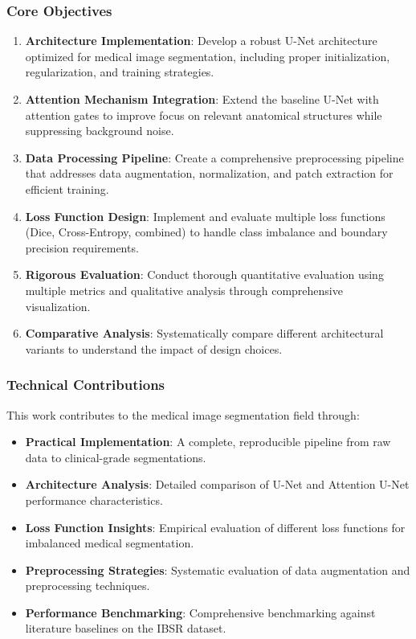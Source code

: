 \documentclass[12pt,a4paper]{article}
\begin{document}
\subsubsection{Core Objectives}
\begin{enumerate}
    \item \textbf{Architecture Implementation}: Develop a robust U-Net architecture optimized for medical image segmentation, including proper initialization, regularization, and training strategies.

    \item \textbf{Attention Mechanism Integration}: Extend the baseline U-Net with attention gates to improve focus on relevant anatomical structures while suppressing background noise.

    \item \textbf{Data Processing Pipeline}: Create a comprehensive preprocessing pipeline that addresses data augmentation, normalization, and patch extraction for efficient training.

    \item \textbf{Loss Function Design}: Implement and evaluate multiple loss functions (Dice, Cross-Entropy, combined) to handle class imbalance and boundary precision requirements.

    \item \textbf{Rigorous Evaluation}: Conduct thorough quantitative evaluation using multiple metrics and qualitative analysis through comprehensive visualization.

    \item \textbf{Comparative Analysis}: Systematically compare different architectural variants to understand the impact of design choices.
\end{enumerate}

\subsubsection{Technical Contributions}
This work contributes to the medical image segmentation field through:

\begin{itemize}
    \item \textbf{Practical Implementation}: A complete, reproducible pipeline from raw data to clinical-grade segmentations.
    \item \textbf{Architecture Analysis}: Detailed comparison of U-Net and Attention U-Net performance characteristics.
    \item \textbf{Loss Function Insights}: Empirical evaluation of different loss functions for imbalanced medical segmentation.
    \item \textbf{Preprocessing Strategies}: Systematic evaluation of data augmentation and preprocessing techniques.
    \item \textbf{Performance Benchmarking}: Comprehensive benchmarking against literature baselines on the IBSR dataset.
\end{itemize}
\end{document}
